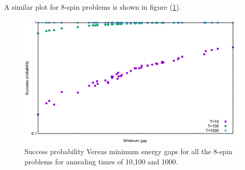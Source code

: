 \documentclass[../main.tex]{subfiles}
\begin{document}
A similar plot for 8-spin problems is shown in figure (\ref{fig:o11}).
\begin{figure}[H]
\centering 
\includegraphics[scale=0.3]{GapVsSucc_s8_T10_100_1000.png}
\caption{Success probability Versus minimum energy gaps for all the 8-spin problems for annealing times of 10,100 and 1000.}
\label{fig:o11}
\end{figure}
\end{document}
